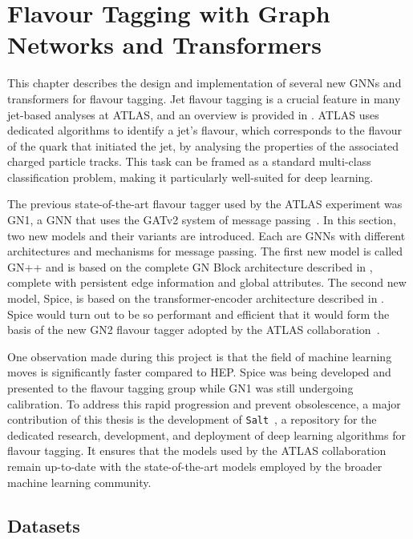 
\chapter{Flavour Tagging with Graph Networks and Transformers}
\label{ch:spice}

This chapter describes the design and implementation of several new GNNs and transformers for flavour tagging.
Jet flavour tagging is a crucial feature in many jet-based analyses at ATLAS, and an overview is provided in .
ATLAS uses dedicated algorithms to identify a jet's flavour, which corresponds to the flavour of the quark that initiated the jet, by analysing the properties of the associated charged particle tracks.
This task can be framed as a standard multi-class classification problem, making it particularly well-suited for deep learning.

The previous state-of-the-art flavour tagger used by the ATLAS experiment was GN1, a GNN that uses the GATv2 system of message passing~\cite{GATv2}.
In this section, two new models and their variants are introduced.
Each are GNNs with different architectures and mechanisms for message passing.
The first new model is called GN++ and is based on the complete GN Block architecture described in , complete with persistent edge information and global attributes.
The second new model, Spice, is based on the transformer-encoder architecture described in .
Spice would turn out to be so performant and efficient that it would form the basis of the new GN2 flavour tagger adopted by the ATLAS collaboration~\cite{GN2Plots}.

One observation made during this project is that the field of machine learning moves is significantly faster compared to HEP.
Spice was being developed and presented to the flavour tagging group while GN1 was still undergoing calibration.
To address this rapid progression and prevent obsolescence, a major contribution of this thesis is the development of \texttt{Salt}~\cite{Salt}, a repository for the dedicated research, development, and deployment of deep learning algorithms for flavour tagging.
It ensures that the models used by the ATLAS collaboration remain up-to-date with the state-of-the-art models employed by the broader machine learning community.

\section{Datasets}

